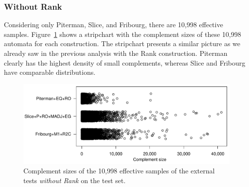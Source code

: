 
\subsubsection{Without Rank}
Considering only Piterman, Slice, and Fribourg, there are 10,998 effective samples. Figure~\ref{e.g.stripchart} shows a stripchart with the complement sizes of these 10,998 automata for each construction. The stripchart presents a similar picture as we already saw in the previous analysis with the Rank construction. Piterman clearly has the highest density of small complements, whereas Slice and Fribourg have comparable distributions.



\begin{figure}[ht]
\centering
\includegraphics[scale=0.575]{figures/r/external/goal/s.stripchart.pdf}
\caption{Complement sizes of the 10,998 effective samples of the external tests \textit{without Rank} on the \goal{} test set.}
\label{e.g.stripchart}
\end{figure}

